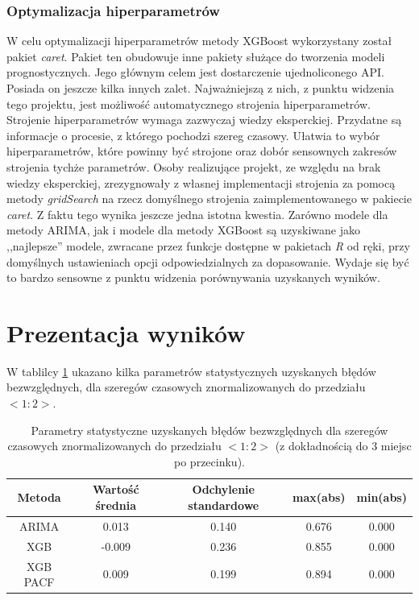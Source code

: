 \documentclass[11pt]{report}
\begin{document}
\subsubsection{Optymalizacja hiperparametrów}
W celu optymalizacji hiperparametrów metody XGBoost wykorzystany został pakiet \textit{caret}.
Pakiet ten obudowuje inne pakiety służące do tworzenia modeli prognostycznych.
Jego głównym celem jest dostarczenie ujednoliconego API.
Posiada on jeszcze kilka innych zalet.
Najważniejszą z nich, z punktu widzenia tego projektu, jest możliwość automatycznego strojenia hiperparametrów.
Strojenie hiperparametrów wymaga zazwyczaj wiedzy eksperckiej.
Przydatne są informacje o procesie, z którego pochodzi szereg czasowy.
Ułatwia to wybór hiperparametrów, które powinny być strojone oraz dobór sensownych zakresów strojenia tychże parametrów.
Osoby realizujące projekt, ze względu na brak wiedzy eksperckiej, zrezygnowały z własnej implementacji strojenia za pomocą metody \textit{gridSearch} na rzecz domyślnego strojenia zaimplementowanego w pakiecie \textit{caret}.
Z faktu tego wynika jeszcze jedna istotna kwestia.
Zarówno modele dla metody ARIMA, jak i modele dla metody XGBoost są uzyskiwane jako ,,najlepsze'' modele, zwracane przez funkcje dostępne w pakietach \textit{R} od ręki, przy domyślnych ustawieniach opcji odpowiedzialnych za dopasowanie.
Wydaje się być to bardzo sensowne z punktu widzenia porównywania uzyskanych wyników.

\section{Prezentacja wyników}

W tablilcy \ref{tab:abs_errors} ukazano kilka parametrów statystycznych uzyskanych błędów bezwzględnych, dla szeregów czasowych znormalizowanych do przedziału $<1:2>$.

\begin{table}[h]
    \centering
    \begin{tabular}{|c|c|c|c|c|}
        \hline
        \textbf{Metoda} & \textbf{Wartość średnia} & \textbf{Odchylenie standardowe} & \textbf{max(abs)} & \textbf{min(abs)} \\
        \hline
        ARIMA & 0.013 & 0.140 & 0.676 & 0.000 \\
        \hline
        XGB & -0.009 & 0.236 & 0.855 & 0.000 \\
        \hline
        XGB PACF & 0.009 & 0.199 & 0.894 & 0.000 \\
        \hline
    \end{tabular}
    \caption{Parametry statystyczne uzyskanych błędów bezwzględnych dla szeregów czasowych znormalizowanych do przedziału $<1:2>$ (z dokładnością do 3 miejsc po przecinku).}
    \label{tab:abs_errors}
\end{table}
\end{document}
